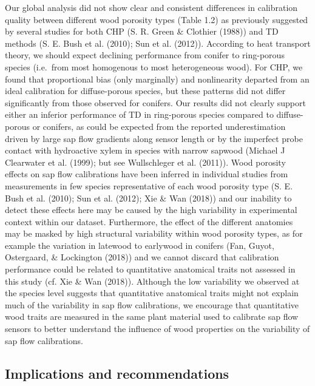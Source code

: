 \documentclass[11pt,twoside]{reedthesis}
\begin{document}
Our global analysis did not show clear and consistent differences in
calibration quality between different wood porosity types (Table 1.2) as
previously suggested by several studies for both CHP (S. R. Green \&
Clothier (1988)) and TD methods (S. E. Bush et al. (2010); Sun et al.
(2012)). According to heat transport theory, we should expect declining
performance from conifer to ring-porous species (i.e.~from most
homogenous to most heterogeneous wood). For CHP, we found that
proportional bias (only marginally) and nonlinearity departed from an
ideal calibration for diffuse-porous species, but these patterns did not
differ significantly from those observed for conifers. Our results did
not clearly support either an inferior performance of TD in ring-porous
species compared to diffuse-porous or conifers, as could be expected
from the reported underestimation driven by large sap flow gradients
along sensor length or by the imperfect probe contact with hydroactive
xylem in species with narrow sapwood (Michael J Clearwater et al.
(1999); but see Wullschleger et al. (2011)). Wood porosity effects on
sap flow calibrations have been inferred in individual studies from
measurements in few species representative of each wood porosity type
(S. E. Bush et al. (2010); Sun et al. (2012); Xie \& Wan (2018)) and our
inability to detect these effects here may be caused by the high
variability in experimental context within our dataset. Furthermore, the
effect of the different anatomies may be masked by high structural
variability within wood porosity types, as for example the variation in
latewood to earlywood in conifers (Fan, Guyot, Ostergaard, \& Lockington
(2018)) and we cannot discard that calibration performance could be
related to quantitative anatomical traits not assessed in this study
(cf. Xie \& Wan (2018)). Although the low variability we observed at the
species level suggests that quantitative anatomical traits might not
explain much of the variability in sap flow calibrations, we encourage
that quantitative wood traits are measured in the same plant material
used to calibrate sap flow sensors to better understand the influence of
wood properties on the variability of sap flow calibrations.\par

\subsection{Implications and
recommendations}\label{implications-and-recommendations}
\end{document}
